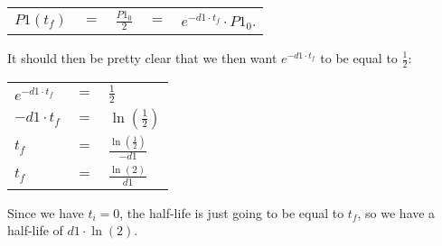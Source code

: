 \documentclass[]{article}
\begin{document}
\begin{enumerate}
\begin{center}
		\begin{tabular}{ l c l c l}
			$P1(t_f)$ & $=$ & $\frac{P1_0}{2}$ & $=$ & $e^{-d1 \cdot t_f} \cdot P1_0$. \\
		\end{tabular}
		\end{center}
	It should then be pretty clear that we then want $e^{-d1 \cdot t_f}$ to be equal to $\frac{1}{2}$:
		\begin{center}
		\begin{tabular}{ l c l}
			 $e^{-d1 \cdot t_f}$ & $=$ & $\frac{1}{2}$ \\
			 $-d1 \cdot t_f$ & $=$ & $\ln(\frac{1}{2})$ \\
			 $t_f$ & $=$ & $\frac{\ln(\frac{1}{2})}{-d1}$ \\
			 $t_f$ & $=$ & $\frac{\ln(2)}{d1}$ \\
		\end{tabular}
		\end{center}
	Since we have $t_i = 0$, the half-life is just going to be equal to $t_f$, so we have a half-life of $d1 \cdot \ln(2)$.
\end{enumerate}
\end{document}
